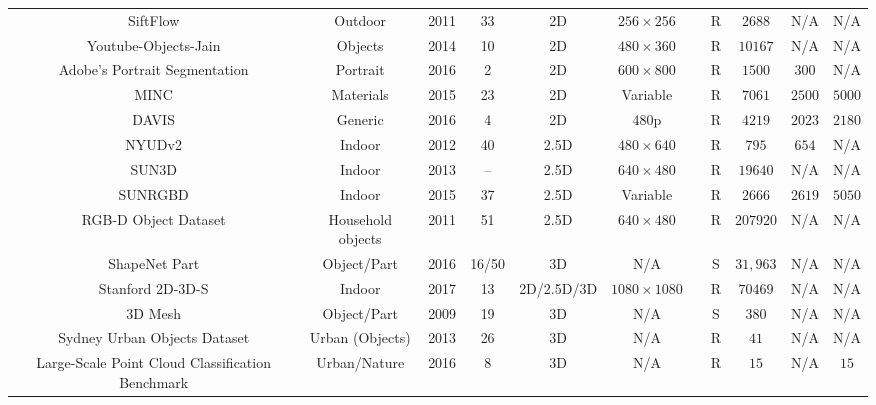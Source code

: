 \begin{table}[!t]
{\begin{tabular}{|c|c|c|c|c|c|c|c|c|c|c|}
		SiftFlow \cite{Liu2009} & Outdoor & 2011 & 33 & 2D & $256\times256$ & \xmark  & R & $2688$ & N/A & N/A \\
		Youtube-Objects-Jain \cite{Jain2014} & Objects & 2014 & 10 & 2D & $480\times360$ & \cmark & R & $10167$ & N/A & N/A\\
		Adobe's Portrait Segmentation \cite{Shen2016} & Portrait & 2016 & 2 & 2D & $600\times800$ & \xmark & R & $1500$ & $300$ & N/A\\
		\acs{MINC} \cite{Bell2015} & Materials & 2015 & 23 & 2D & Variable & \xmark & R & $7061$ & $2500$ & $5000$\\
		\acs{DAVIS} \cite{Perazzi2016}\cite{Pont-Tuset2017} & Generic & 2016 & 4 & 2D & 480p & \cmark & R & $4219$ & $2023$ & $2180$\\
		NYUDv2 \cite{Silberman2012} & Indoor & 2012 & 40 & 2.5D & $480\times640$ & \xmark & R & $795$ & $654$ & N/A\\
		SUN3D \cite{Xiao2013} & Indoor & 2013 & -- & 2.5D & $640\times480$ & \cmark & R & $19640$ & N/A & N/A\\
		SUNRGBD \cite{Song2015b} & Indoor & 2015 & 37 & 2.5D & Variable & \xmark & R & $2666$ & $2619$ & $5050$\\
		RGB-D Object Dataset\cite{lai2011large} & Household objects & 2011 & 51 & 2.5D & $640\times480$ & \cmark & R & $207920$ & N/A & N/A\\
		ShapeNet Part\cite{Yi2016} & Object/Part & 2016 & 16/50 & 3D & N/A & \xmark & S & $31,963$ & N/A & N/A\\
		Stanford 2D-3D-S\cite{Armeni2017} & Indoor & 2017 & 13 & 2D/2.5D/3D & $1080\times1080$ & \cmark & R & $70469$ & N/A & N/A\\
		3D Mesh \cite{Chen:2009:ABF} & Object/Part & 2009 & 19 & 3D & N/A & \xmark & S & 380 & N/A & N/A\\
		Sydney Urban Objects Dataset\cite{quadros2012feature} & Urban (Objects) & 2013 & 26 & 3D & N/A & \xmark & R & $41$ & N/A & N/A\\
		Large-Scale Point Cloud Classification Benchmark\cite{hackel2016contour} & Urban/Nature & 2016 & 8 & 3D & N/A & \xmark  &  R & $15$ & N/A & $15$\\
		
		\hline
	\end{tabular}}
	\label{table:datasets}
\end{table}

